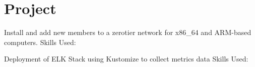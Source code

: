 \documentclass[]{openfont}
\begin{document}
\begin{minipage}[t]{0.66\textwidth}


\section{Project}

Install and add new members to a zerotier network for x86\_64 and ARM-based computers.
Skills Used: 
\sectionsep

Deployment of ELK Stack using Kustomize to collect metrics data
Skills Used: 
\sectionsep




\end{minipage}
\end{document}
